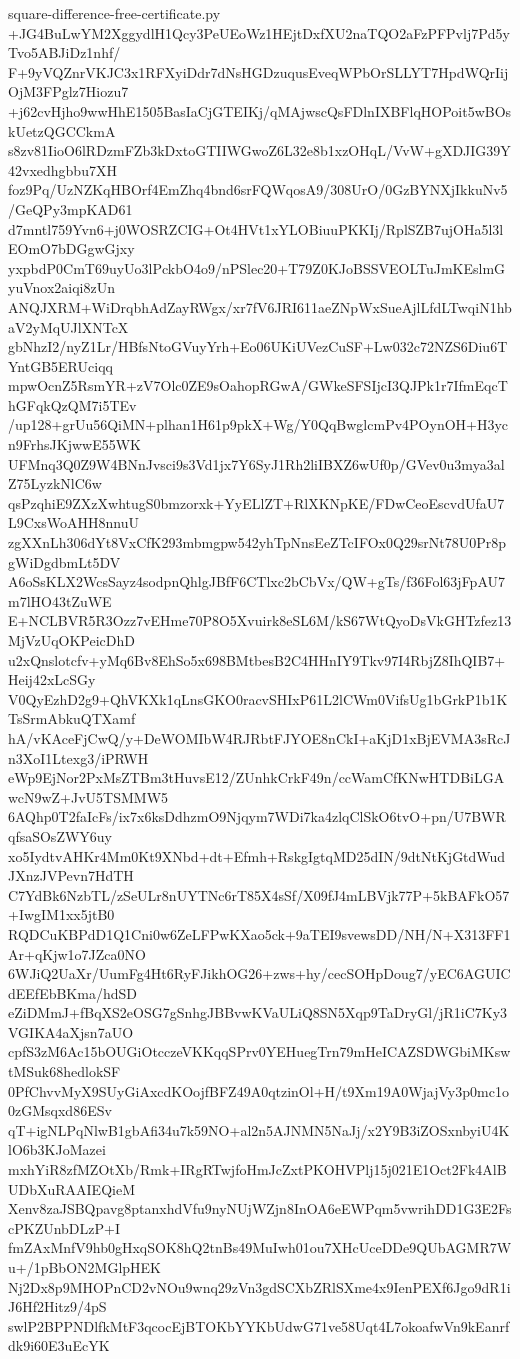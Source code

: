 \documentclass[11pt]{article}
\theoremstyle{definition}
\theoremstyle{remark}
\begin{document}
\begin{filecontents*}[overwrite]{square-difference-free-certificate.py}
+JG4BuLwYM2XggydlH1Qcy3PeUEoWz1HEjtDxfXU2naTQO2aFzPFPvlj7Pd5yTvo5ABJiDz1nhf/
F+9yVQZnrVKJC3x1RFXyiDdr7dNsHGDzuqusEveqWPbOrSLLYT7HpdWQrIijOjM3FPglz7Hiozu7
+j62cvHjho9wwHhE1505BasIaCjGTEIKj/qMAjwscQsFDlnIXBFlqHOPoit5wBOskUetzQGCCkmA
s8zv81IioO6lRDzmFZb3kDxtoGTIIWGwoZ6L32e8b1xzOHqL/VvW+gXDJIG39Y42vxedhgbbu7XH
foz9Pq/UzNZKqHBOrf4EmZhq4bnd6srFQWqosA9/308UrO/0GzBYNXjIkkuNv5/GeQPy3mpKAD61
d7mntl759Yvn6+j0WOSRZCIG+Ot4HVt1xYLOBiuuPKKIj/RplSZB7ujOHa5l3lEOmO7bDGgwGjxy
yxpbdP0CmT69uyUo3lPckbO4o9/nPSlec20+T79Z0KJoBSSVEOLTuJmKEslmGyuVnox2aiqi8zUn
ANQJXRM+WiDrqbhAdZayRWgx/xr7fV6JRI611aeZNpWxSueAjlLfdLTwqiN1hbaV2yMqUJlXNTcX
gbNhzI2/nyZ1Lr/HBfsNtoGVuyYrh+Eo06UKiUVezCuSF+Lw032c72NZS6Diu6TYntGB5ERUciqq
mpwOcnZ5RsmYR+zV7Olc0ZE9sOahopRGwA/GWkeSFSIjcI3QJPk1r7IfmEqcThGFqkQzQM7i5TEv
/up128+grUu56QiMN+plhan1H61p9pkX+Wg/Y0QqBwglcmPv4POynOH+H3ycn9FrhsJKjwwE55WK
UFMnq3Q0Z9W4BNnJvsci9s3Vd1jx7Y6SyJ1Rh2liIBXZ6wUf0p/GVev0u3mya3alZ75LyzkNlC6w
qsPzqhiE9ZXzXwhtugS0bmzorxk+YyELlZT+RlXKNpKE/FDwCeoEscvdUfaU7L9CxsWoAHH8nnuU
zgXXnLh306dYt8VxCfK293mbmgpw542yhTpNnsEeZTcIFOx0Q29srNt78U0Pr8pgWiDgdbmLt5DV
A6oSsKLX2WcsSayz4sodpnQhlgJBfF6CTlxc2bCbVx/QW+gTs/f36Fol63jFpAU7m7lHO43tZuWE
E+NCLBVR5R3Ozz7vEHme70P8O5Xvuirk8eSL6M/kS67WtQyoDsVkGHTzfez13MjVzUqOKPeicDhD
u2xQnslotcfv+yMq6Bv8EhSo5x698BMtbesB2C4HHnIY9Tkv97I4RbjZ8IhQIB7+Heij42xLcSGy
V0QyEzhD2g9+QhVKXk1qLnsGKO0racvSHIxP61L2lCWm0VifsUg1bGrkP1b1KTsSrmAbkuQTXamf
hA/vKAceFjCwQ/y+DeWOMIbW4RJRbtFJYOE8nCkI+aKjD1xBjEVMA3sRcJn3XoI1Ltexg3/iPRWH
eWp9EjNor2PxMsZTBm3tHuvsE12/ZUnhkCrkF49n/ccWamCfKNwHTDBiLGAwcN9wZ+JvU5TSMMW5
6AQhp0T2faIcFs/ix7x6ksDdhzmO9Njqym7WDi7ka4zlqClSkO6tvO+pn/U7BWRqfsaSOsZWY6uy
xo5IydtvAHKr4Mm0Kt9XNbd+dt+Efmh+RskgIgtqMD25dIN/9dtNtKjGtdWudJXnzJVPevn7HdTH
C7YdBk6NzbTL/zSeULr8nUYTNc6rT85X4sSf/X09fJ4mLBVjk77P+5kBAFkO57+IwgIM1xx5jtB0
RQDCuKBPdD1Q1Cni0w6ZeLFPwKXao5ck+9aTEI9svewsDD/NH/N+X313FF1Ar+qKjw1o7JZca0NO
6WJiQ2UaXr/UumFg4Ht6RyFJikhOG26+zws+hy/cecSOHpDoug7/yEC6AGUICdEEfEbBKma/hdSD
eZiDMmJ+fBqXS2eOSG7gSnhgJBBvwKVaULiQ8SN5Xqp9TaDryGl/jR1iC7Ky3VGIKA4aXjsn7aUO
cpfS3zM6Ac15bOUGiOtcczeVKKqqSPrv0YEHuegTrn79mHeICAZSDWGbiMKswtMSuk68hedlokSF
0PfChvvMyX9SUyGiAxcdKOojfBFZ49A0qtzinOl+H/t9Xm19A0WjajVy3p0mc1o0zGMsqxd86ESv
qT+igNLPqNlwB1gbAfi34u7k59NO+al2n5AJNMN5NaJj/x2Y9B3iZOSxnbyiU4KlO6b3KJoMazei
mxhYiR8zfMZOtXb/Rmk+IRgRTwjfoHmJcZxtPKOHVPlj15j021E1Oct2Fk4AlBUDbXuRAAIEQieM
Xenv8zaJSBQpavg8ptanxhdVfu9nyNUjWZjn8InOA6eEWPqm5vwrihDD1G3E2FscPKZUnbDLzP+I
fmZAxMnfV9hb0gHxqSOK8hQ2tnBs49MuIwh01ou7XHcUceDDe9QUbAGMR7Wu+/1pBbON2MGlpHEK
Nj2Dx8p9MHOPnCD2vNOu9wnq29zVn3gdSCXbZRlSXme4x9IenPEXf6Jgo9dR1iJ6Hf2Hitz9/4pS
swlP2BPPNDlfkMtF3qcocEjBTOKbYYKbUdwG71ve58Uqt4L7okoafwVn9kEanrfdk9i60E3uEcYK

\end{filecontents*}
\end{document}
